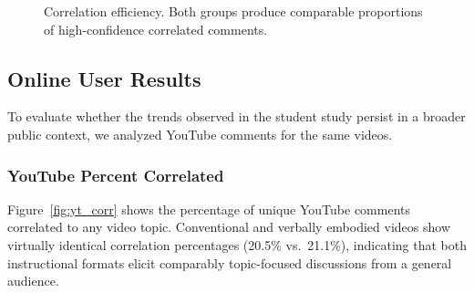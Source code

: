 \begin{figure}[h!]
    \centering
    \caption{Correlation efficiency. Both groups produce comparable proportions of high-confidence correlated comments.}
    \label{fig:res_eff}
\end{figure}

\subsection{Online User Results}
To evaluate whether the trends observed in the student study persist in a broader public context, we analyzed YouTube comments for the same videos.

\subsubsection{YouTube Percent Correlated}
Figure~\ref{fig:yt_corr} shows the percentage of unique YouTube comments correlated to any video topic. Conventional and verbally embodied videos show virtually identical correlation percentages (20.5\% vs.\ 21.1\%), indicating that both instructional formats elicit comparably topic-focused discussions from a general audience.

